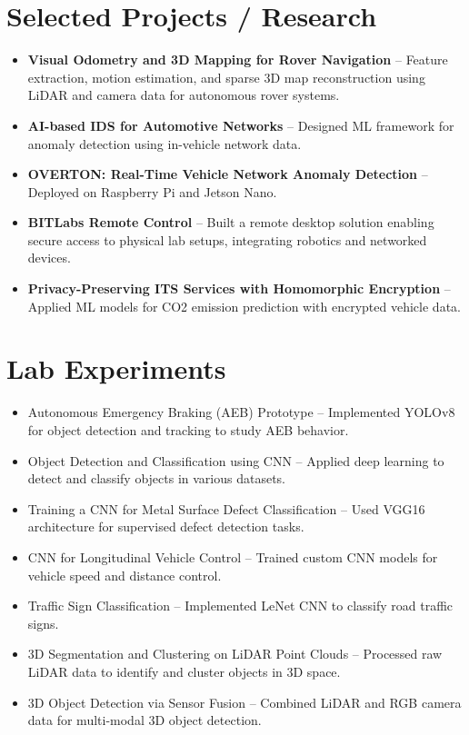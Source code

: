 \documentclass[a4paper,11pt]{article}
\begin{document}
\section*{Selected Projects / Research}
\begin{itemize}
    \item \textbf{Visual Odometry and 3D Mapping for Rover Navigation} -- Feature extraction, motion estimation, and sparse 3D map reconstruction using LiDAR and camera data for autonomous rover systems.
    \item \textbf{AI-based IDS for Automotive Networks} -- Designed ML framework for anomaly detection using in-vehicle network data.
    \item \textbf{OVERTON: Real-Time Vehicle Network Anomaly Detection} -- Deployed on Raspberry Pi and Jetson Nano.
    \item \textbf{BITLabs Remote Control} -- Built a remote desktop solution enabling secure access to physical lab setups, integrating robotics and networked devices.
    \item \textbf{Privacy-Preserving ITS Services with Homomorphic Encryption} -- Applied ML models for CO2 emission prediction with encrypted vehicle data.
\end{itemize}

\section*{Lab Experiments}
\begin{itemize}
    \item Autonomous Emergency Braking (AEB) Prototype -- Implemented YOLOv8 for object detection and tracking to study AEB behavior.
    \item Object Detection and Classification using CNN -- Applied deep learning to detect and classify objects in various datasets.
    \item Training a CNN for Metal Surface Defect Classification -- Used VGG16 architecture for supervised defect detection tasks.
    \item CNN for Longitudinal Vehicle Control -- Trained custom CNN models for vehicle speed and distance control.
    \item Traffic Sign Classification -- Implemented LeNet CNN to classify road traffic signs.
    \item 3D Segmentation and Clustering on LiDAR Point Clouds -- Processed raw LiDAR data to identify and cluster objects in 3D space.
    \item 3D Object Detection via Sensor Fusion -- Combined LiDAR and RGB camera data for multi-modal 3D object detection.
\end{itemize}
\end{document}
